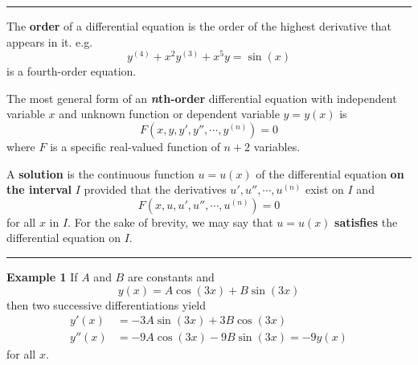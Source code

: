\documentclass{article}
\begin{document}
\par\noindent\rule{\textwidth}{0.4pt}

The \textbf{order} of a differential equation is the order of the highest derivative that appears in it. e.g.
$$ y^{(4)} + x^2y^{(3)} + x^5y = \sin(x) $$
is a fourth-order equation.

The most general form of an \textbf{\textit{n}th-order} differential equation with independent variable $ x $ and unknown function or dependent variable $ y= y(x) $ is
$$ F \left( x,y,y',y'',\cdots,y^{(n)} \right) = 0 $$
where $ F $ is a specific real-valued function of $ n + 2 $ variables.

A \textbf{solution} is the continuous function $ u = u(x) $ of the differential equation \textbf{on the interval} $ I $ provided that the derivatives $ u',u'',\cdots,u^{(n)} $ exist on $ I $ and
$$ F \left( x,u,u',u'',\cdots,u^{(n)} \right) = 0 $$
for all $ x $ in  $ I $. For the sake of brevity, we may say that $ u = u(x) $ \textbf{satisfies} the differential equation on $ I $.

\par\noindent\rule{\textwidth}{0.4pt}

\textbf{Example 1}
If $ A $ and $ B $ are constants and
$$ y(x) = A\cos(3x) + B\sin(3x) $$
then two successive differentiations yield 
\begin{align*}
    y'(x) & = -3A\sin(3x) + 3B\cos(3x) \\
    y''(x) & = -9A\cos(3x) - 9B\sin(3x) = -9y(x)
\end{align*}
for all $ x $.
\end{document}
